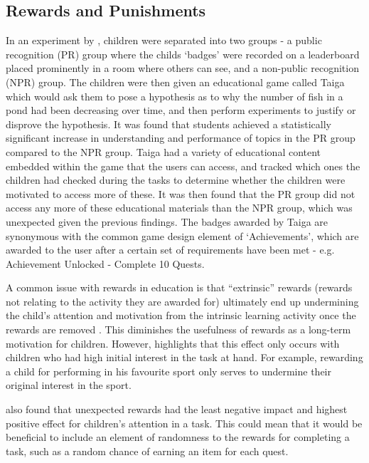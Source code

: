 \subsection{Rewards and Punishments}
In an experiment by \cite{Filsecker2014136}, children were separated into two groups - a public recognition (PR) group where the childs `badges' were recorded on a leaderboard placed prominently in a room where others can see, and a non-public recognition (NPR) group.
The children were then given an educational game called Taiga which would ask them to pose a hypothesis as to why the number of fish in a pond had been decreasing over time, and then perform experiments to justify or disprove the hypothesis.
It was found that students achieved a statistically significant increase in understanding and performance of topics in the PR group compared to the NPR group.
Taiga had a variety of educational content embedded within the game that the users can access, and tracked which ones the children had checked during the tasks to determine whether the children were motivated to access more of these. 
It was then found that the PR group did not access any more of these educational materials than the NPR group, which was unexpected given the previous findings. 
The badges awarded by Taiga are synonymous with the common game design element of `Achievements', which are awarded to the user after a certain set of requirements have been met - e.g. Achievement Unlocked - Complete 10 Quests.

A common issue with rewards in education is that ``extrinsic'' rewards (rewards not relating to the activity they are awarded for) ultimately end up undermining the child's attention and motivation from the intrinsic learning activity once the rewards are removed \citep{deci2001extrinsic,ACP:ACP2350090502}.
This diminishes the usefulness of rewards as a long-term motivation for children.
However, \cite{cameron2001negative} highlights that this effect only occurs with children who had high initial interest in the task at hand. 
For example, rewarding a child for performing in his favourite sport only serves to undermine their original interest in the sport.

\cite{deci2001extrinsic} also found that unexpected rewards had the least negative impact and highest positive effect for children's attention in a task. 
This could mean that it would be beneficial to include an element of randomness to the rewards for completing a task, such as a random chance of earning an item for each quest.


